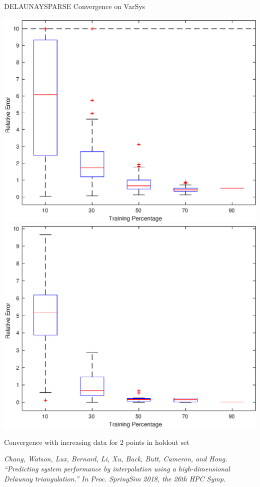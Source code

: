 \documentclass[xcolor=dvipsnames]{beamer}
\begin{document}
\begin{frame}{DELAUNAYSPARSE Convergence on VarSys}
\centerline{\includegraphics[width=.4\textwidth]{q2.eps}\hskip 20pt
\includegraphics[width=.4\textwidth]{q3.eps}}
\centerline{Convergence with increasing data for 2 points in holdout set}
\medskip
{\it \small Chang, Watson, Lux, Bernard, Li, Xu, Back, Butt, Cameron, and Hong.
``Predicting system performance by interpolation using a high-dimensional
Delaunay triangulation.'' In Proc. SpringSim 2018, the 26th HPC Symp.}
\end{frame}
\end{document}
